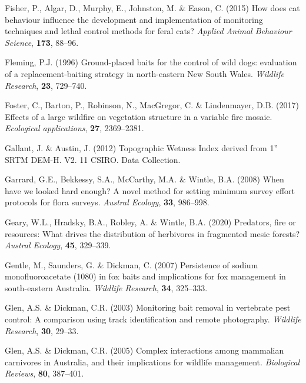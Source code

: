 \documentclass[]{elsarticle} %
\begin{document}
\leavevmode\hypertarget{ref-fisher2015cat}{}%
Fisher, P., Algar, D., Murphy, E., Johnston, M. \& Eason, C. (2015) How does cat behaviour influence the development and implementation of monitoring techniques and lethal control methods for feral cats? \emph{Applied Animal Behaviour Science}, \textbf{173}, 88--96.

\leavevmode\hypertarget{ref-fleming1996ground}{}%
Fleming, P.J. (1996) Ground-placed baits for the control of wild dogs: evaluation of a replacement-baiting strategy in north-eastern New South Wales. \emph{Wildlife Research}, \textbf{23}, 729--740.

\leavevmode\hypertarget{ref-foster2017effects}{}%
Foster, C., Barton, P., Robinson, N., MacGregor, C. \& Lindenmayer, D.B. (2017) Effects of a large wildfire on vegetation structure in a variable fire mosaic. \emph{Ecological applications}, \textbf{27}, 2369--2381.

\leavevmode\hypertarget{ref-gallant2012topographic}{}%
Gallant, J. \& Austin, J. (2012) Topographic Wetness Index derived from 1'' SRTM DEM-H. V2. 11 CSIRO. Data Collection.

\leavevmode\hypertarget{ref-garrard2008when}{}%
Garrard, G.E., Bekkessy, S.A., McCarthy, M.A. \& Wintle, B.A. (2008) When have we looked hard enough? A novel method for setting minimum survey effort protocols for flora surveys. \emph{Austral Ecology}, \textbf{33}, 986--998.

\leavevmode\hypertarget{ref-geary2020predators}{}%
Geary, W.L., Hradsky, B.A., Robley, A. \& Wintle, B.A. (2020) Predators, fire or resources: What drives the distribution of herbivores in fragmented mesic forests? \emph{Austral Ecology}, \textbf{45}, 329--339.

\leavevmode\hypertarget{ref-gentle2007persistence}{}%
Gentle, M., Saunders, G. \& Dickman, C. (2007) Persistence of sodium monofluoroacetate (1080) in fox baits and implications for fox management in south-eastern Australia. \emph{Wildlife Research}, \textbf{34}, 325--333.

\leavevmode\hypertarget{ref-glen2003monitoring}{}%
Glen, A.S. \& Dickman, C.R. (2003) Monitoring bait removal in vertebrate pest control: A comparison using track identification and remote photography. \emph{Wildlife Research}, \textbf{30}, 29--33.

\leavevmode\hypertarget{ref-glen2005complex}{}%
Glen, A.S. \& Dickman, C.R. (2005) Complex interactions among mammalian carnivores in Australia, and their implications for wildlife management. \emph{Biological Reviews}, \textbf{80}, 387--401.
\end{document}
